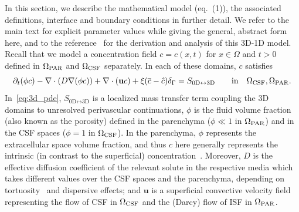 \documentclass[fleqn,10pt]{wlscirep}
\begin{document}
In this section, we describe the mathematical model (eq.~(1)), the
associated definitions, interface and boundary conditions in further
detail. We refer to the main text for explicit parameter values while
giving the general, abstract form here, and to the
reference~\cite{masri2024modelling, laurino2019derivation} for the
derivation and analysis of this 3D-1D model. Recall that we model a
concentration field $c = c(x, t)$ for $x \in \Omega$ and $t > 0$
defined in $\Omega_{\rm PAR}$ and $\Omega_{\rm CSF}$ separately. In
each of these domains, $c$ satisfies
\begin{equation}
  \partial_t (\phi c) - \nabla \cdot (D \nabla (\phi c) ) + \nabla \cdot (\mathbf{u} c ) + \xi (\overline{c} - \hat c ) \delta_\Gamma
   = S_{\text{0D} \leftrightarrow \text{3D}}
  \quad \quad \mathrm{in} \quad \Omega_{\rm CSF}, \Omega_{\rm{PAR}}.
  \label{eq:3d_pde}
\end{equation}
In~\eqref{eq:3d_pde}, $S_{\text{0D} \leftrightarrow \text{3D}}$ is a localized mass transfer term coupling the 3D domains to unresolved perivascular continuations, $\phi$ is the fluid volume fraction (also known as the porosity) defined in the parenchyma ($\phi \ll 1$ in $\Omega_{\rm PAR}$) and in the CSF spaces ($\phi = 1$ in $\Omega_{\rm CSF}$). In the parenchyma, $\phi$ represents the extracellular space volume fraction, and thus $c$ here generally represents the intrinsic (in contrast to the superficial) concentration~\cite{sykova2008diffusion}. Moreover, $D$ is the effective diffusion coefficient of the relevant solute in the respective media which takes different values over the CSF spaces and the parenchyma, depending on tortuosity~\cite{sykova2008diffusion} and dispersive effects; and $\mathbf{u}$ is a superficial convective velocity field representing the flow of CSF in $\Omega_{\rm CSF}$ and the (Darcy) flow of ISF in $\Omega_{\rm PAR}$.
\end{document}
